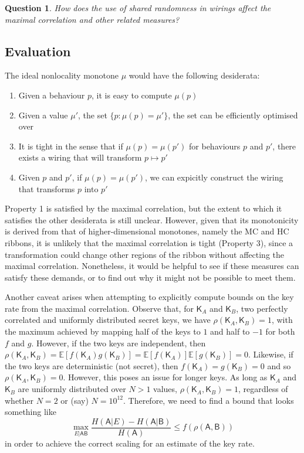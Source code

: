 \documentclass[10pt, a4paper]{article}
\numberwithin{equation}{section} %
\theoremstyle{definition}
\theoremstyle{plain}
\newtheorem{question}{Question}
\newcommand{\st}{\mathrel{:}} %
\newcommand{\?}{\mathrel{?}} %
\newcommand{\E}{\mathbb{E}} %
\newcommand{\crv}[1]{\mathsf{#1}}
\begin{document}
    \begin{question}
      How does the use of shared randomness in wirings affect the maximal correlation and other related measures?
    \end{question}

    \subsection{Evaluation}

    The ideal nonlocality monotone \(\mu\) would have the following desiderata:
    \begin{enumerate}
      \item Given a behaviour \(p\), it is easy to compute \(\mu(p)\)
      \item Given a value \(\mu'\), the set \(\{ p \st \mu(p) = \mu' \}\), the set can be efficiently optimised over
      \item It is tight in the sense that if \(\mu(p) = \mu(p')\) for behaviours \(p\) and \(p'\), there exists a wiring that will transform \(p \mapsto p'\)
      \item Given \(p\) and \(p'\), if \(\mu(p) = \mu(p')\), we can expicitly construct the wiring that transforms \(p\) into \(p'\)
    \end{enumerate}

    Property 1 is satisfied by the maximal correlation, but the extent to which it satisfies the other desiderata is still unclear. However, given that its monotonicity is derived from that of higher-dimensional monotones, namely the MC and HC ribbons, it is unlikely that the maximal correlation is tight (Property 3), since a transformation could change other regions of the ribbon without affecting the maximal correlation. Nonetheless, it would be helpful to see if these measures can satisfy these demands, or to find out why it might not be possible to meet them.

    Another caveat arises when attempting to explicitly compute bounds on the key rate from the maximal correlation. Observe that, for \(\crv{K}_A\) and \(\crv{K}_B\), two perfectly correlated and uniformly distributed secret keys, we have \(\rho(\crv{K}_A, \crv{K}_B) = 1\), with the maximum achieved by mapping half of the keys to \(1\) and half to \(-1\) for both \(f\) and \(g\). However, if the two keys are independent, then \(\rho(\crv{K}_A,\crv{K}_B) = \E[f(\crv{K}_A)g(\crv{K}_B)] = \E[f(\crv{K}_A)]\E[g(\crv{K}_B)] = 0\). Likewise, if the two keys are deterministic (not secret), then \(f(\crv{K}_A) = g(\crv{K}_B) = 0\) and so \(\rho(\crv{K}_A, \crv{K}_B) = 0\). However, this poses an issue for longer keys. As long as \(\crv{K}_A\) and \(\crv{K}_B\) are uniformly distributed over \(N > 1\) values, \(\rho(\crv{K}_A, \crv{K}_B) = 1\), regardless of whether \(N = 2\) or (say) \(N = 10^{12}\). Therefore, we need to find a bound that looks something like
    \begin{equation}
      \max_{E|\crv{AB}} \frac{H(\crv{A}|E) - H(\crv{A}|\crv{B})}{H(\crv{A})} \leq f(\rho(\crv{A},\crv{B}))
    \end{equation}
    in order to achieve the correct scaling for an estimate of the key rate.
\end{document}

